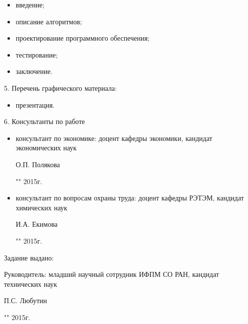 \begin{itemize}
 \item введение;
 \item описание алгоритмов;
 \item проектирование программного обеспечения;
 \item тестирование;
 \item заключение.
\end{itemize}

5. Перечень графического материала:

\begin{itemize}
 \item презентация.
\end{itemize}

6. Консультанты по работе

\begin{itemize}
  \item консультант по экономике: доцент кафедры экономики, кандидат \\ экономических наук \\
  \begin{singlespace}
 О.П. Полякова\hfill \underline{\hspace{6cm}} \\
 \begin{flushright} "\underline{\hspace{1cm}}"\underline{\hspace{3cm}} 2015г. \end{flushright}
 \end{singlespace}
 \item консультант по вопросам охраны труда: доцент кафедры РЭТЭМ, кандидат химических наук\\
 \begin{singlespace}
 И.А. Екимова \hfill \underline{\hspace{6cm}} \\
 \begin{flushright} "\underline{\hspace{1cm}}"\underline{\hspace{3cm}} 2015г. \end{flushright}
 \end{singlespace}
\end{itemize}

Задание выдано:

Руководитель: младший научный сотрудник ИФПМ СО РАН, кандидат технических наук \\
\begin{singlespace}
П.С. Любутин \hfill \underline{\hspace{6cm}} \\
\begin{flushright} "\underline{\hspace{1cm}}"\underline{\hspace{3cm}} 2015г. \end{flushright}
\end{singlespace}


